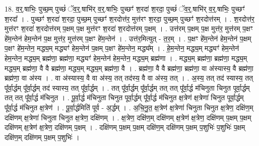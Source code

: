 \documentclass[17pt]{extarticle}
\begin{document}
18. व॒र्॒.षाभिः॒ पुच्छ॒म् पुच्छं॑ ॅव॒र्॒.षाभि॑र् व॒र्॒.षाभिः॒ पुच्छꣳ॑ श॒रदा॑ श॒रदा॒ पुच्छं॑ ॅव॒र्॒.षाभि॑र् व॒र्॒.षाभिः॒ पुच्छꣳ॑ श॒रदा᳚ । . पुच्छꣳ॑ श॒रदा॑ श॒रदा॒ पुच्छ॒म् पुच्छꣳ॑ श॒रदोत्त॑र॒ मुत्त॑रꣳ श॒रदा॒ पुच्छ॒म् पुच्छꣳ॑ श॒रदोत्त॑रम् । . श॒रदोत्त॑र॒ मुत्त॑रꣳ श॒रदा॑ श॒रदोत्त॑रम् प॒क्षम् प॒क्ष मुत्त॑रꣳ श॒रदा॑ श॒रदोत्त॑रम् प॒क्षम् । . उत्त॑रम् प॒क्षम् प॒क्ष मुत्त॑र॒ मुत्त॑रम् प॒क्षꣳ हे॑म॒न्तेन॑ हेम॒न्तेन॑ प॒क्ष मुत्त॑र॒ मुत्त॑रम् प॒क्षꣳ हे॑म॒न्तेन॑ । . उत्त॑र॒मित्युत् - त॒र॒म् । . प॒क्षꣳ हे॑म॒न्तेन॑ हेम॒न्तेन॑ प॒क्षम् प॒क्षꣳ हे॑म॒न्तेन॒ मद्ध्य॒म् मद्ध्यꣳ॑ हेम॒न्तेन॑ प॒क्षम् प॒क्षꣳ हे॑म॒न्तेन॒ मद्ध्य᳚म् । . हे॒म॒न्तेन॒ मद्ध्य॒म् मद्ध्यꣳ॑ हेम॒न्तेन॑ हेम॒न्तेन॒ मद्ध्य॒म् ब्रह्म॑णा॒ ब्रह्म॑णा॒ मद्ध्यꣳ॑ हेम॒न्तेन॑ हेम॒न्तेन॒ मद्ध्य॒म् ब्रह्म॑णा । . मद्ध्य॒म् ब्रह्म॑णा॒ ब्रह्म॑णा॒ मद्ध्य॒म् मद्ध्य॒म् ब्रह्म॑णा॒ वै वै ब्रह्म॑णा॒ मद्ध्य॒म् मद्ध्य॒म् ब्रह्म॑णा॒ वै । . ब्रह्म॑णा॒ वै वै ब्रह्म॑णा॒ ब्रह्म॑णा॒ वा अ॑स्यास्य॒ वै ब्रह्म॑णा॒ ब्रह्म॑णा॒ वा अ॑स्य । . वा अ॑स्यास्य॒ वै वा अ॑स्य॒ तत् तद॑स्य॒ वै वा अ॑स्य॒ तत् । . अ॒स्य॒ तत् तद॑ स्यास्य॒ तत् पू᳚र्वा॒र्द्धम् पू᳚र्वा॒र्द्धम् तद॑ स्यास्य॒ तत् पू᳚र्वा॒र्द्धम् । . तत् पू᳚र्वा॒र्द्धम् पू᳚र्वा॒र्द्धम् तत् तत् पू᳚र्वा॒र्द्ध म॑चिनुता चिनुत पूर्वा॒र्द्धम् तत् तत् पू᳚र्वा॒र्द्ध म॑चिनुत । . पू॒र्वा॒र्द्ध म॑चिनुता चिनुत पूर्वा॒र्द्धम् पू᳚र्वा॒र्द्ध म॑चिनुत क्ष॒त्रेण॑ क्ष॒त्रेणा॑ चिनुत पूर्वा॒र्द्धम् पू᳚र्वा॒र्द्ध म॑चिनुत क्ष॒त्रेण॑ । . पू॒र्वा॒र्द्धमिति॑ पूर्व - अ॒र्द्धम् । . अ॒चि॒नु॒त॒ क्ष॒त्रेण॑ क्ष॒त्रेणा॑ चिनुता चिनुत क्ष॒त्रेण॒ दक्षि॑ण॒म् दक्षि॑णम् क्ष॒त्रेणा॑ चिनुता चिनुत क्ष॒त्रेण॒ दक्षि॑णम् । . क्ष॒त्रेण॒ दक्षि॑ण॒म् दक्षि॑णम् क्ष॒त्रेण॑ क्ष॒त्रेण॒ दक्षि॑णम् प॒क्षम् प॒क्षम् दक्षि॑णम् क्ष॒त्रेण॑ क्ष॒त्रेण॒ दक्षि॑णम् प॒क्षम् । . दक्षि॑णम् प॒क्षम् प॒क्षम् दक्षि॑ण॒म् दक्षि॑णम् प॒क्षम् प॒शुभिः॑ प॒शुभिः॑ प॒क्षम् दक्षि॑ण॒म् दक्षि॑णम् प॒क्षम् प॒शुभिः॑ । \newline
\end{document}
